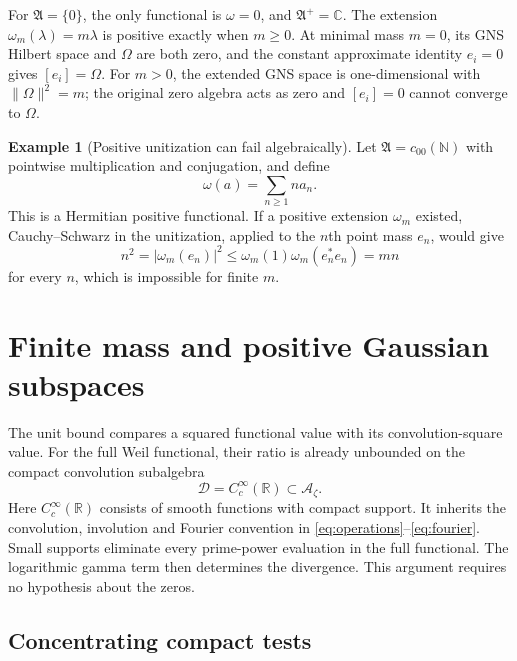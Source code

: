 \documentclass[11pt]{article}
\theoremstyle{definition}
\newtheorem{example}[theorem]{Example}
\theoremstyle{remark}
\numberwithin{equation}{section}
\newcommand{\cA}{\mathcal A}
\newcommand{\R}{\mathbb R}
\newcommand{\C}{\mathbb C}
\begin{document}
For $\mathfrak A=\{0\}$, the only functional is $\omega=0$, and
$\mathfrak A^+=\C$.  The extension $\omega_m(\lambda)=m\lambda$
is positive exactly when $m\geq0$.
At minimal mass $m=0$, its GNS Hilbert space and $\Omega$ are both zero,
and the constant approximate identity $e_i=0$ gives $[e_i]=\Omega$.
For $m>0$, the extended GNS space is one-dimensional with
$\|\Omega\|^2=m$; the original zero algebra acts as zero and
$[e_i]=0$ cannot converge to $\Omega$.

\begin{example}[Positive unitization can fail algebraically]
Let $\mathfrak A=c_{00}(\mathbb N)$ with pointwise multiplication and
conjugation, and define
\[
 \omega(a)=\sum_{n\geq1}n a_n.
\]
This is a Hermitian positive functional.  If a positive extension
$\omega_m$ existed, Cauchy--Schwarz in the unitization, applied to the
$n$th point mass $e_n$, would give
\[
 n^2=|\omega_m(e_n)|^2
 \leq\omega_m(1)\omega_m(e_n^*e_n)=mn
\]
for every $n$, which is impossible for finite $m$.
\end{example}


\section{Finite mass and positive Gaussian subspaces}
\label{sec:weil-mass}

The unit bound compares a squared functional value with its
convolution-square value.  For the full Weil functional, their ratio is
already unbounded on the compact convolution subalgebra
\[
 \mathscr D=C_c^\infty(\R)\subset\cA_\zeta.
\]
Here $C_c^\infty(\R)$ consists of smooth functions with compact support.
It inherits the convolution, involution and Fourier convention in
\eqref{eq:operations}--\eqref{eq:fourier}.
Small supports eliminate every prime-power evaluation in the full
functional.  The logarithmic gamma term then determines the divergence.
This argument requires no hypothesis about the zeros.

\subsection{Concentrating compact tests}
\end{document}
